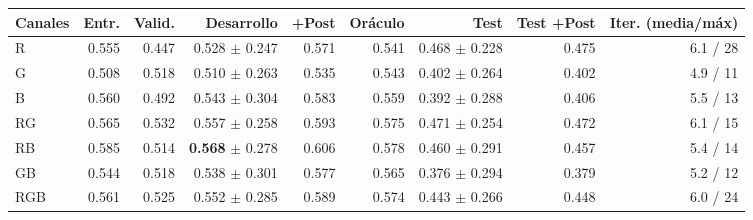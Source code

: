 \footnotesize
\begin{tabular}{lrrrrrrrr}
\toprule
Canales & Entr. & Valid. & Desarrollo & +Post & Oráculo & Test & Test +Post & Iter. (media/máx) \\
\midrule
R & 0.555 & 0.447 & 0.528 $\pm$ 0.247 & 0.571 & 0.541 & 0.468 $\pm$ 0.228 & 0.475 & 6.1 / 28 \\
G & 0.508 & 0.518 & 0.510 $\pm$ 0.263 & 0.535 & 0.543 & 0.402 $\pm$ 0.264 & 0.402 & 4.9 / 11 \\
B & 0.560 & 0.492 & 0.543 $\pm$ 0.304 & 0.583 & 0.559 & 0.392 $\pm$ 0.288 & 0.406 & 5.5 / 13 \\
RG & 0.565 & 0.532 & 0.557 $\pm$ 0.258 & 0.593 & 0.575 & 0.471 $\pm$ 0.254 & 0.472 & 6.1 / 15 \\
RB & 0.585 & 0.514 & \textbf{0.568} $\pm$ 0.278 & 0.606 & 0.578 & 0.460 $\pm$ 0.291 & 0.457 & 5.4 / 14 \\
GB & 0.544 & 0.518 & 0.538 $\pm$ 0.301 & 0.577 & 0.565 & 0.376 $\pm$ 0.294 & 0.379 & 5.2 / 12 \\
RGB & 0.561 & 0.525 & 0.552 $\pm$ 0.285 & 0.589 & 0.574 & 0.443 $\pm$ 0.266 & 0.448 & 6.0 / 24 \\
\bottomrule
\end{tabular}
